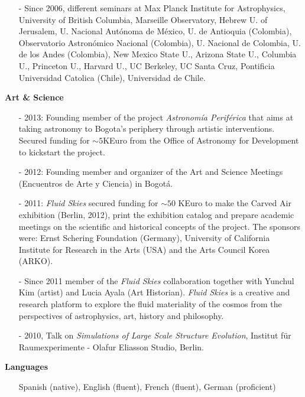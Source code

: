 \documentclass[letterpaper,11pt,onecolumn]{article}
\begin{document}
\begin{itemize}
\item [-] Since 2006, different seminars at Max Planck Institute for
  Astrophysics, University of British Columbia, Marseille Observatory,
  Hebrew U. of Jerusalem, U. Nacional Aut\'onoma de M\'exico, U. de
  Antioquia (Colombia), Observatorio Astron\'omico Nacional
  (Colombia), U. Nacional de Colombia, U. de los Andes (Colombia), New
  Mexico State U., Arizona State U., Columbia U., Princeton U.,
  Harvard U., UC Berkeley, UC Santa Cruz, Pontificia Universidad
  Catolica (Chile), Universidad de Chile. 
\end{itemize}


{\bf Art \& Science}
\begin{itemize}
\item [-] 2013: Founding member of the project \emph{Astronom\'ia
  Perif\'erica} that aims at taking astronomy to Bogota's periphery
  through artistic interventions.  Secured funding for $\sim 5$KEuro
  from the Office of Astronomy for Development to kickstart the
  project. 
\item [-] 2012: Founding member and organizer of the Art and Science Meetings (Encuentros de Arte y Ciencia) in Bogot\'a.
\item [-] 2011: {\it Fluid Skies} secured funding for $\sim 50$ KEuro
  to make the Carved Air exhibition (Berlin, 2012), print the
  exhibition catalog and prepare academic meetings on the scientific
  and historical concepts of the project. The sponsors were: Ernst
  Schering Foundation (Germany), University of California Institute
  for Research in the Arts (USA) and the Arts Council Korea (ARKO).  
\item [-] Since 2011 member of the {\it Fluid Skies} collaboration
  together with Yunchul Kim (artist) and Lucia Ayala (Art
  Historian). {\it Fluid Skies} is a creative and research platform to
  explore the fluid materiality of the cosmos from the perspectives of
  astrophysics, art, history and philosophy. 
\item [-] 2010, Talk on {\it Simulations of Large Scale Structure
  Evolution}, Institut f\"ur Raumexperimente - Olafur Eliasson Studio,
  Berlin.  
\end{itemize}


{\bf Languages}
\begin{itemize}
\item[]Spanish (native), English (fluent), French (fluent), German (proficient)
\end{itemize}

\end{document}
